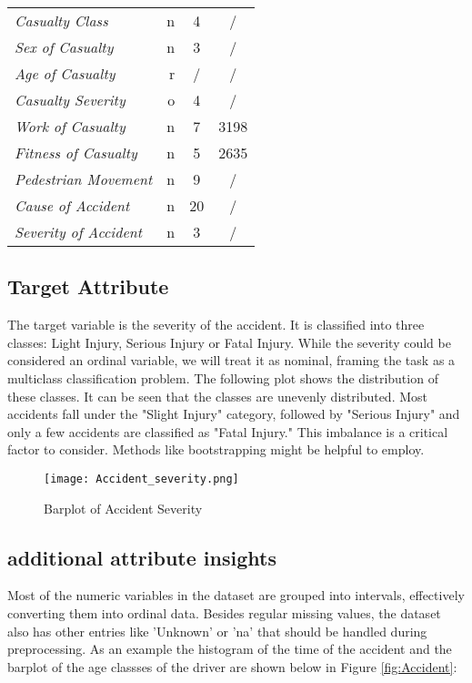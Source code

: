 \documentclass{article}
\begin{document}
\begin{table}[H]
{\begin{tabular}{l|r|c|c}
            \textit{Casualty Class} & n & 4 &/ \\
            \textit{Sex of Casualty} & n & 3 & / \\
            \textit{Age of Casualty} & r & / & /\\
            \textit{Casualty Severity} & o & 4 & / \\
            \textit{Work of Casualty} & n & 7 & 3198\\
            \textit{Fitness of Casualty} & n & 5 & 2635 \\
            \textit{Pedestrian Movement} & n & 9 &/ \\
            \textit{Cause of Accident} & n & 20 & /\\
            \textit{Severity of Accident} & n & 3 & /
        \end{tabular}}
\end{table}

\vspace{-8pt}
\subsection{Target Attribute}
\vspace{-6pt}
The target variable is the severity of the accident. It is classified into three classes: Light Injury, Serious Injury or Fatal Injury. While the severity could be considered an ordinal variable, we will treat it as nominal, framing the task as a multiclass classification problem. The following plot shows the distribution of these classes. It can be seen that the classes are unevenly distributed. Most accidents fall under the "Slight Injury" category, followed by "Serious Injury" and only a few accidents are classified as "Fatal Injury." This imbalance is a critical factor to consider. Methods like bootstrapping might be helpful to employ. 

\begin{figure}[H]
\centering
\texttt{[image: Accident\_severity.png]}
\caption{\label{fig:hist:severity} Barplot of Accident Severity}
\end{figure}

\vspace{-20pt}
\subsection{additional attribute insights}
\vspace{-8pt}
Most of the numeric variables in the dataset are grouped into intervals, effectively converting them into ordinal data. Besides regular missing values, the dataset also has other entries like 'Unknown' or 'na' that should be handled during preprocessing. As an example the histogram of the time of the accident and the barplot of the age classses of the driver are shown below in Figure \ref{fig:Accident}:
\end{document}
